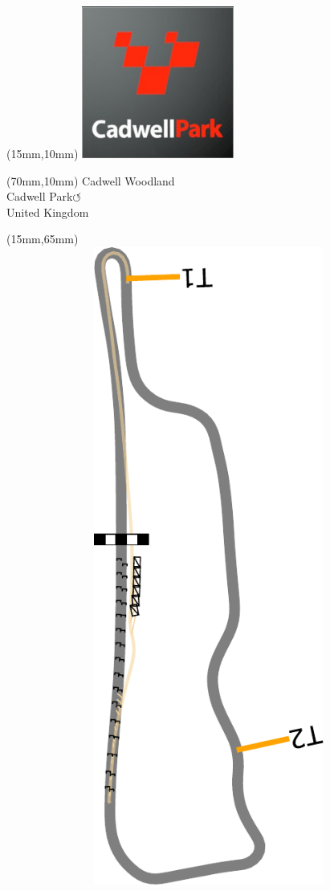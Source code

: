 \null\newpage
\begin{textblock*}{50mm}(15mm,10mm)%
\includegraphics[width=50mm]{LG/2015-05-20_00076.png}
\end{textblock*}
\begin{textblock*}{130mm}(70mm,10mm)%
{\fontsize{20}{20}\selectfont Cadwell Woodland\\}
{\fontsize{16}{16}\selectfont Cadwell Park\hfill \huge$\circlearrowleft$\\}
{\fontsize{12}{12}\selectfont United Kingdom\\}
\end{textblock*}
\begin{textblock*}{185mm}(15mm,65mm)%
\centering
\mbox{\includegraphics[width=185mm,height=210mm,keepaspectratio]{PT/CADWOL.pdf}}
\end{textblock*}
